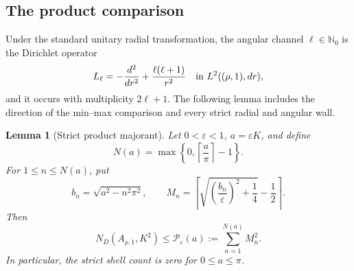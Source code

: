 \documentclass[11pt]{article}
\numberwithin{equation}{section}
\newtheorem{lemma}[theorem]{Lemma}
\theoremstyle{definition}
\theoremstyle{remark}
\begin{document}
\subsection{The product comparison}

Under the standard unitary radial transformation, the angular channel
\(\ell\in\mathbb N_0\) is the Dirichlet operator
\[
  L_\ell=-\frac{d^2}{dr^2}+\frac{\ell(\ell+1)}{r^2}
  \quad\hbox{in }L^2((\rho,1),dr),
\]
and it occurs with multiplicity \(2\ell+1\).  The following lemma includes
the direction of the min--max comparison and every strict radial and angular
wall.

\begin{lemma}[Strict product majorant]
\label{thin:lem-product-majorant}
Let \(0<\varepsilon<1\), \(a=\varepsilon K\), and define
\begin{equation}
  N(a)=\max\left\{0,\left\lceil\frac a\pi\right\rceil-1\right\}.
  \label{thin:eq-radial-count}
\end{equation}
For \(1\leq n\leq N(a)\), put
\[
  b_n=\sqrt{a^2-n^2\pi^2},
  \qquad
  M_n=
  \left\lceil
  \sqrt{\left(\frac{b_n}{\varepsilon}\right)^2+\frac14}
  -\frac12
  \right\rceil.
\]
Then
\begin{equation}
  N_D(A_{\rho,1},K^2)
  \leq \mathcal P_\varepsilon(a)
  :=\sum_{n=1}^{N(a)}M_n^2.
  \label{thin:eq-product-majorant}
\end{equation}
In particular, the strict shell count is zero for \(0\leq a\leq\pi\).
\end{lemma}
\end{document}
